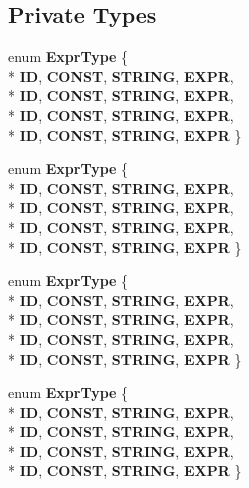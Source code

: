\subsection*{Private Types}
\begin{DoxyCompactItemize}
\item 
enum {\bfseries Expr\-Type} \{ \\*
{\bfseries I\-D}, 
{\bfseries C\-O\-N\-S\-T}, 
{\bfseries S\-T\-R\-I\-N\-G}, 
{\bfseries E\-X\-P\-R}, 
\\*
{\bfseries I\-D}, 
{\bfseries C\-O\-N\-S\-T}, 
{\bfseries S\-T\-R\-I\-N\-G}, 
{\bfseries E\-X\-P\-R}, 
\\*
{\bfseries I\-D}, 
{\bfseries C\-O\-N\-S\-T}, 
{\bfseries S\-T\-R\-I\-N\-G}, 
{\bfseries E\-X\-P\-R}, 
\\*
{\bfseries I\-D}, 
{\bfseries C\-O\-N\-S\-T}, 
{\bfseries S\-T\-R\-I\-N\-G}, 
{\bfseries E\-X\-P\-R}
 \}
\item 
enum {\bfseries Expr\-Type} \{ \\*
{\bfseries I\-D}, 
{\bfseries C\-O\-N\-S\-T}, 
{\bfseries S\-T\-R\-I\-N\-G}, 
{\bfseries E\-X\-P\-R}, 
\\*
{\bfseries I\-D}, 
{\bfseries C\-O\-N\-S\-T}, 
{\bfseries S\-T\-R\-I\-N\-G}, 
{\bfseries E\-X\-P\-R}, 
\\*
{\bfseries I\-D}, 
{\bfseries C\-O\-N\-S\-T}, 
{\bfseries S\-T\-R\-I\-N\-G}, 
{\bfseries E\-X\-P\-R}, 
\\*
{\bfseries I\-D}, 
{\bfseries C\-O\-N\-S\-T}, 
{\bfseries S\-T\-R\-I\-N\-G}, 
{\bfseries E\-X\-P\-R}
 \}
\item 
enum {\bfseries Expr\-Type} \{ \\*
{\bfseries I\-D}, 
{\bfseries C\-O\-N\-S\-T}, 
{\bfseries S\-T\-R\-I\-N\-G}, 
{\bfseries E\-X\-P\-R}, 
\\*
{\bfseries I\-D}, 
{\bfseries C\-O\-N\-S\-T}, 
{\bfseries S\-T\-R\-I\-N\-G}, 
{\bfseries E\-X\-P\-R}, 
\\*
{\bfseries I\-D}, 
{\bfseries C\-O\-N\-S\-T}, 
{\bfseries S\-T\-R\-I\-N\-G}, 
{\bfseries E\-X\-P\-R}, 
\\*
{\bfseries I\-D}, 
{\bfseries C\-O\-N\-S\-T}, 
{\bfseries S\-T\-R\-I\-N\-G}, 
{\bfseries E\-X\-P\-R}
 \}
\item 
enum {\bfseries Expr\-Type} \{ \\*
{\bfseries I\-D}, 
{\bfseries C\-O\-N\-S\-T}, 
{\bfseries S\-T\-R\-I\-N\-G}, 
{\bfseries E\-X\-P\-R}, 
\\*
{\bfseries I\-D}, 
{\bfseries C\-O\-N\-S\-T}, 
{\bfseries S\-T\-R\-I\-N\-G}, 
{\bfseries E\-X\-P\-R}, 
\\*
{\bfseries I\-D}, 
{\bfseries C\-O\-N\-S\-T}, 
{\bfseries S\-T\-R\-I\-N\-G}, 
{\bfseries E\-X\-P\-R}, 
\\*
{\bfseries I\-D}, 
{\bfseries C\-O\-N\-S\-T}, 
{\bfseries S\-T\-R\-I\-N\-G}, 
{\bfseries E\-X\-P\-R}
 \}
\end{DoxyCompactItemize}
